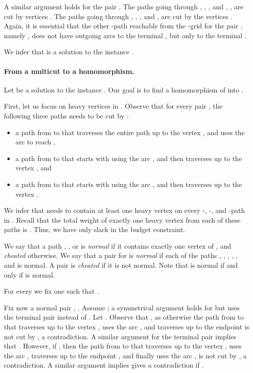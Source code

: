 A similar argument holds for the pair . The paths going through , ,
, and , , are cut by vertices
.
The paths going through , , , and ,
are cut by the vertices . Again, it is essential that the other -path
reachable from the -grid for the pair , namely , does not have outgoing arcs to the terminal , but only
to the terminal .

We infer that  is a solution to the \dirmc{} instance .

\paragraph{From a multicut to a homomorphism.}
Let  be a solution to the \dirmc{} instance . Our goal is to find a homomorphism of  into .

First, let us focus on heavy vertices in . Observe that for every pair ,  the following three paths needs to be cut by :
\begin{itemize}
\item
a path from  to  that traverses the entire path  up to the vertex , and uses the arc  to reach
, 
\item a path from  to  that starts with using the arc , and then traverses 
up to the vertex , and 
\item a path from  to  that starts with using the arc , and then traverses 
up to the vertex .
\end{itemize}
We infer that  needs to contain at least one heavy vertex on every -, -, and -path in . Recall that the total weight of exactly one heavy vertex from 
each of these paths is . Thus, we have only  slack in the budget constraint.

We say that a path , , or  is \emph{normal}
if it contains exactly one vertex of , and \emph{cheated}
otherwise.
We say that a pair  for  is \emph{normal}
if each of the paths , , , , 
, and  is normal.
A pair  is \emph{cheated} if it is not normal.
Note that  is normal if and only if  is normal.

For every  we fix one  such that
.

Fix now a normal pair , .
Assume ; a symmetrical argument holds for  but uses the terminal pair 
instead of . Let . 
Observe that , as otherwise the path from  to  that traverses  up to the vertex , uses the arc , and traverses  up to the endpoint  is not cut by , a contradiction.
A similar argument for the terminal pair  implies that .
However, if , then the path from  to  that traverses  up to the vertex , uses the arc
, traverses  up to the endpoint , and finally uses the arc , is not cut by ,
a contradiction. A similar argument implies gives a contradiction if .

